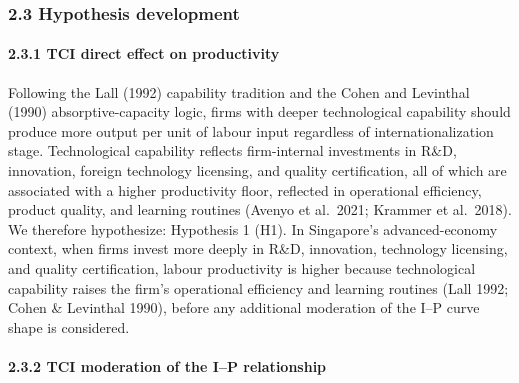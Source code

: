 \documentclass[
  12pt,a4paper]{article}
\begin{document}
\hypertarget{hypothesis-development}{%
\subsubsection{2.3 Hypothesis
development}\label{hypothesis-development}}

\hypertarget{tci-direct-effect-on-productivity}{%
\paragraph{2.3.1 TCI direct effect on
productivity}\label{tci-direct-effect-on-productivity}}

Following the Lall (1992) capability tradition and the Cohen and
Levinthal (1990) absorptive-capacity logic, firms with deeper
technological capability should produce more output per unit of labour
input regardless of internationalization stage. Technological capability
reflects firm-internal investments in R\&D, innovation, foreign
technology licensing, and quality certification, all of which are
associated with a higher productivity floor, reflected in operational
efficiency, product quality, and learning routines (Avenyo et al.~2021;
Krammer et al.~2018). We therefore hypothesize: Hypothesis 1 (H1). In
Singapore's advanced-economy context, when firms invest more deeply in
R\&D, innovation, technology licensing, and quality certification,
labour productivity is higher because technological capability raises
the firm's operational efficiency and learning routines (Lall 1992;
Cohen \& Levinthal 1990), before any additional moderation of the I--P
curve shape is considered.

\hypertarget{tci-moderation-of-the-ip-relationship}{%
\paragraph{2.3.2 TCI moderation of the I--P
relationship}\label{tci-moderation-of-the-ip-relationship}}
\end{document}
